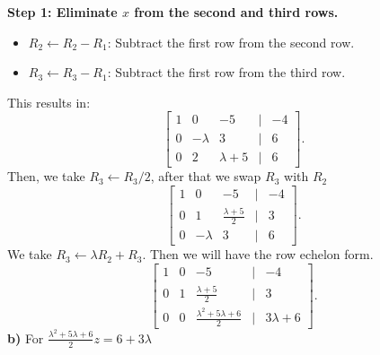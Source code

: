 \documentclass{article}
\begin{document}
        \textbf{Step 1: Eliminate \(x\) from the second and third rows.}
        \begin{itemize}
            \item \(R_2 \leftarrow R_2 - R_1\): Subtract the first row from the second row.
            \item \(R_3 \leftarrow R_3 - R_1\): Subtract the first row from the third row.
        \end{itemize}
        This results in:
        \[
        \begin{bmatrix}
        1 & 0 & -5 & | & -4 \\
        0 & -\lambda & 3 & | & 6 \\
        0 & 2 & \lambda + 5 & | & 6
        \end{bmatrix}.
        \]
        Then, we take \(R_{3} \leftarrow R_{3} / 2\), after that we swap \(R_{3}\) with \(R_2\)
        \[
        \begin{bmatrix}
        1 & 0 & -5 & | & -4 \\
        0 & 1 & \frac{\lambda + 5}{2} & | & 3 \\
        0 & -\lambda & 3 & | & 6 
        \end{bmatrix}.
        \]
        We take \(R_3 \leftarrow \lambda R_{2} + R_{3}\). Then we will have the row echelon form.
        \[
        \begin{bmatrix}
        1 & 0 & -5 & | & -4 \\
        0 & 1 & \frac{\lambda + 5}{2} & | & 3 \\
        0 & 0 & \frac{\lambda^{2} + 5\lambda + 6}{2} & | &3 \lambda +  6 
        \end{bmatrix}.
        \]
        \textbf{b)} For \(\frac{\lambda^2 + 5 \lambda + 6}{2}z = 6 + 3 \lambda\)
\end{document}
